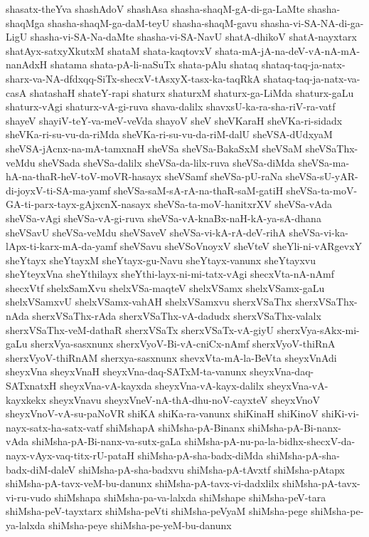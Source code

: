 {shasatx-theYva
shashAdoV
shashAsa
shasha-shaqM-gA-di-ga-LaMte
shasha-shaqMga
shasha-shaqM-ga-daM-teyU
shasha-shaqM-gavu
shasha-vi-SA-NA-di-ga-LigU
shasha-vi-SA-Na-daMte
shasha-vi-SA-NavU
shatA-dhikoV
shatA-nayxtarx
shatAyx-satxyXkutxM
shataM
shata-kaqtovxV
shata-mA-jA-na-deV-vA-nA-mA-nanAdxH
shatama
shata-pA-li-naSuTx
shata-pAlu
shataq
shataq-taq-ja-natx-sharx-va-NA-dfdxqq-SiTx-shecxV-tAsxyX-tasx-ka-taqRkA
shataq-taq-ja-natx-va-casA
shatashaH
shateY-rapi
shaturx
shaturxM
shaturx-ga-LiMda
shaturx-gaLu
shaturx-vAgi
shaturx-vA-gi-ruva
shava-dalilx
shavxsU-ka-ra-sha-riV-ra-vatf
shayeV
shayiV-teY-va-meV-veVda
shayoV
sheV
sheVKaraH
sheVKa-ri-sidadx
sheVKa-ri-su-vu-da-riMda
sheVKa-ri-su-vu-da-riM-dalU
sheVSA-dUdxyaM
sheVSA-jAcnx-na-mA-tamxnaH
sheVSa
sheVSa-BakaSxM
sheVSaM
sheVSaThx-veMdu
sheVSada
sheVSa-dalilx
sheVSa-da-lilx-ruva
sheVSa-diMda
sheVSa-ma-hA-na-thaR-heV-toV-moVR-hasayx
sheVSamf
sheVSa-pU-raNa
sheVSa-sU-yAR-di-joyxV-ti-SA-ma-yamf
sheVSa-saM-sA-rA-na-thaR-saM-gatiH
sheVSa-ta-moV-GA-ti-parx-tayx-gAjxcnX-nasayx
sheVSa-ta-moV-hanitxrXV
sheVSa-vAda
sheVSa-vAgi
sheVSa-vA-gi-ruva
sheVSa-vA-knaBx-naH-kA-ya-sA-dhana
sheVSavU
sheVSa-veMdu
sheVSaveV
sheVSa-vi-kA-rA-deV-rihA
sheVSa-vi-ka-lApx-ti-karx-mA-da-yamf
sheVSavu
sheVSoVnoyxV
sheVteV
sheYli-ni-vARgevxY
sheYtayx
sheYtayxM
sheYtayx-gu-Navu
sheYtayx-vanunx
sheYtayxvu
sheYteyxVna
sheYthilayx
sheYthi-layx-ni-mi-tatx-vAgi
shecxVta-nA-nAmf
shecxVtf
shelxSamXvu
shelxVSa-maqteV
shelxVSamx
shelxVSamx-gaLu
shelxVSamxvU
shelxVSamx-vahAH
shelxVSamxvu
sherxVSaThx
sherxVSaThx-nAda
sherxVSaThx-rAda
sherxVSaThx-vA-dadudx
sherxVSaThx-valalx
sherxVSaThx-veM-dathaR
sherxVSaTx
sherxVSaTx-vA-giyU
sherxVya-sAkx-mi-gaLu
sherxVya-sasxnunx
sherxVyoV-Bi-vA-cniCx-nAmf
sherxVyoV-thiRnA
sherxVyoV-thiRnAM
sherxya-sasxnunx
shevxVta-mA-la-BeVta
sheyxVnAdi
sheyxVna
sheyxVnaH
sheyxVna-daq-SATxM-ta-vanunx
sheyxVna-daq-SATxnatxH
sheyxVna-vA-kayxda
sheyxVna-vA-kayx-dalilx
sheyxVna-vA-kayxkekx
sheyxVnavu
sheyxVneV-nA-thA-dhu-noV-cayxteV
sheyxVnoV
sheyxVnoV-vA-su-paNoVR
shiKA
shiKa-ra-vanunx
shiKinaH
shiKinoV
shiKi-vi-nayx-satx-ha-satx-vatf
shiMshapA
shiMsha-pA-Binanx
shiMsha-pA-Bi-nanx-vAda
shiMsha-pA-Bi-nanx-va-sutx-gaLa
shiMsha-pA-nu-pa-la-bidhx-shecxV-da-nayx-vAyx-vaq-titx-rU-pataH
shiMsha-pA-sha-badx-diMda
shiMsha-pA-sha-badx-diM-daleV
shiMsha-pA-sha-badxvu
shiMsha-pA-tAvxtf
shiMsha-pAtapx
shiMsha-pA-tavx-veM-bu-danunx
shiMsha-pA-tavx-vi-dadxlilx
shiMsha-pA-tavx-vi-ru-vudo
shiMshapa
shiMsha-pa-va-lalxda
shiMshape
shiMsha-peV-tara
shiMsha-peV-tayxtarx
shiMsha-peVti
shiMsha-peVyaM
shiMsha-pege
shiMsha-pe-ya-lalxda
shiMsha-peye
shiMsha-pe-yeM-bu-danunx
}
